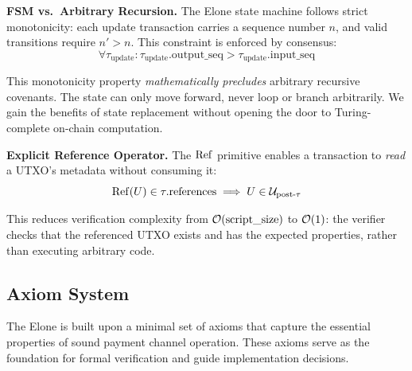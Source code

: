 \textbf{FSM vs.\ Arbitrary Recursion.} The Elone state machine follows strict monotonicity: each update transaction carries a sequence number $n$, and valid transitions require $n' > n$. This constraint is enforced by consensus:
$$\forall \tau_{\text{update}}: \tau_{\text{update}}.\text{output\_seq} > \tau_{\text{update}}.\text{input\_seq}$$

This monotonicity property \textit{mathematically precludes} arbitrary recursive covenants. The state can only move forward, never loop or branch arbitrarily. We gain the benefits of state replacement without opening the door to Turing-complete on-chain computation.

\textbf{Explicit Reference Operator.} The $\operatorname{Ref}$ primitive enables a transaction to \textit{read} a UTXO's metadata without consuming it:
$$\operatorname{Ref}(U) \in \tau.\text{references} \implies U \in \mathcal{U}_{\text{post-}\tau}$$

This reduces verification complexity from $\mathcal{O}(\text{script\_size})$ to $\mathcal{O}(1)$: the verifier checks that the referenced UTXO exists and has the expected properties, rather than executing arbitrary code.

\subsection{Axiom System}

The Elone is built upon a minimal set of axioms that capture the essential properties of sound payment channel operation. These axioms serve as the foundation for formal verification and guide implementation decisions.

